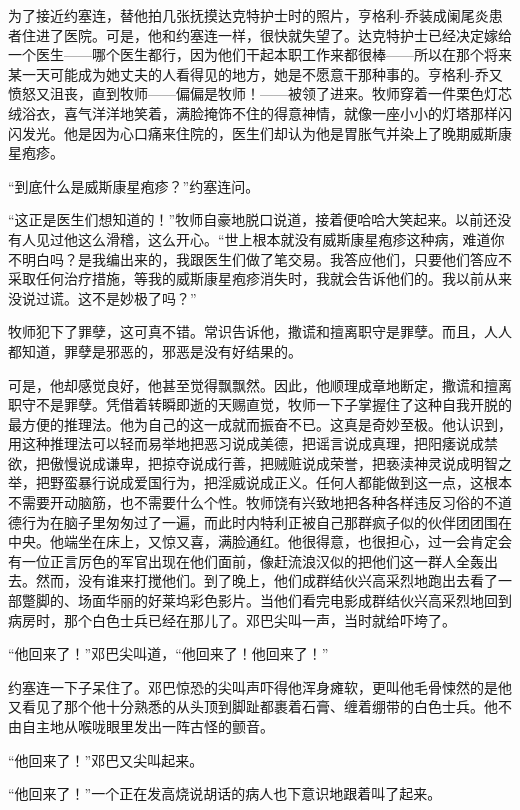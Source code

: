     为了接近约塞连，替他拍几张抚摸达克特护士时的照片，亨格利-乔装成阑尾炎患者住进了医院。可是，他和约塞连一样，很快就失望了。达克特护士已经决定嫁给一个医生——哪个医生都行，因为他们干起本职工作来都很棒——所以在那个将来某一天可能成为她丈夫的人看得见的地方，她是不愿意干那种事的。亨格利-乔又愤怒又沮丧，直到牧师——偏偏是牧师！——被领了进来。牧师穿着一件栗色灯芯绒浴衣，喜气洋洋地笑着，满脸掩饰不住的得意神情，就像一座小小的灯塔那样闪闪发光。他是因为心口痛来住院的，医生们却认为他是胃胀气并染上了晚期威斯康星疱疹。

    “到底什么是威斯康星疱疹？”约塞连问。

    “这正是医生们想知道的！”牧师自豪地脱口说道，接着便哈哈大笑起来。以前还没有人见过他这么滑稽，这么开心。“世上根本就没有威斯康星疱疹这种病，难道你不明白吗？是我编出来的，我跟医生们做了笔交易。我答应他们，只要他们答应不采取任何治疗措施，等我的威斯康星疱疹消失时，我就会告诉他们的。我以前从来没说过谎。这不是妙极了吗？”

    牧师犯下了罪孽，这可真不错。常识告诉他，撒谎和擅离职守是罪孽。而且，人人都知道，罪孽是邪恶的，邪恶是没有好结果的。

 


    可是，他却感觉良好，他甚至觉得飘飘然。因此，他顺理成章地断定，撒谎和擅离职守不是罪孽。凭借着转瞬即逝的天赐直觉，牧师一下子掌握住了这种自我开脱的最方便的推理法。他为自己的这一成就而振奋不已。这真是奇妙至极。他认识到，用这种推理法可以轻而易举地把恶习说成美德，把谣言说成真理，把阳痿说成禁欲，把傲慢说成谦卑，把掠夺说成行善，把贼赃说成荣誉，把亵渎神灵说成明智之举，把野蛮暴行说成爱国行为，把淫威说成正义。任何人都能做到这一点，这根本不需要开动脑筋，也不需要什么个性。牧师饶有兴致地把各种各样违反习俗的不道德行为在脑子里匆匆过了一遍，而此时内特利正被自己那群疯子似的伙伴团团围在中央。他端坐在床上，又惊又喜，满脸通红。他很得意，也很担心，过一会肯定会有一位正言厉色的军官出现在他们面前，像赶流浪汉似的把他们这一群人全轰出去。然而，没有谁来打搅他们。到了晚上，他们成群结伙兴高采烈地跑出去看了一部蹩脚的、场面华丽的好莱坞彩色影片。当他们看完电影成群结伙兴高采烈地回到病房时，那个白色士兵已经在那儿了。邓巴尖叫一声，当时就给吓垮了。

    “他回来了！”邓巴尖叫道，“他回来了！他回来了！”

    约塞连一下子呆住了。邓巴惊恐的尖叫声吓得他浑身瘫软，更叫他毛骨悚然的是他又看见了那个他十分熟悉的从头顶到脚趾都裹着石膏、缠着绷带的白色士兵。他不由自主地从喉咙眼里发出一阵古怪的颤音。

    “他回来了！”邓巴又尖叫起来。

    “他回来了！”一个正在发高烧说胡话的病人也下意识地跟着叫了起来。


